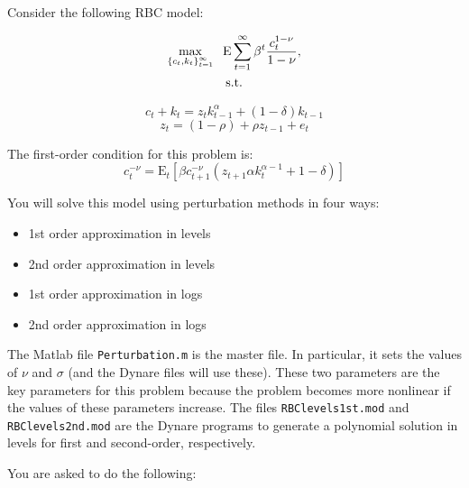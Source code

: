 \documentclass{article}
\begin{document}
\noindent Consider the following RBC model:

\begin{gather*}
\max_{\left\{ c_{t},k_{t}\right\} _{t=1}^{\infty }}\hspace{2mm}\displaystyle%
\text{E}\sum_{t=1}^{\infty }\beta ^{t}\frac{c_{t}^{1-\nu }}{1-\nu }, \\
\text{s.t.}
\end{gather*}

\begin{equation}
c_{t}+k_{t}=z_{t}k_{t-1}^{\alpha }+(1-\delta )k_{t-1}
\end{equation}%
\begin{equation}
z_{t}=(1-\rho )+\rho z_{t-1}+e_{t}
\end{equation}

\noindent The first-order condition for this problem is: 
\begin{equation}
c_{t}^{-\nu }=\text{E}_{t}\left[ \beta c_{t+1}^{-\nu }\left( z_{t+1}\alpha
k_{t}^{\alpha -1}+1-\delta \right) \right] 
\end{equation}

You will solve this model using perturbation methods in four ways:

\begin{itemize}
\item 1st order approximation in levels

\item 2nd order approximation in levels

\item 1st order approximation in logs

\item 2nd order approximation in logs
\end{itemize}

The Matlab file \texttt{Perturbation.m} is the master file. In particular,
it sets the values of $\nu $ and $\sigma $ (and the Dynare files will use
these). These two parameters are the key parameters for this problem because
the problem becomes more nonlinear if the values of these parameters
increase. The files \texttt{RBClevels1st.mod}  and \texttt{RBClevels2nd.mod}
are the Dynare programs to generate a polynomial solution in levels for
first and second-order, respectively. 

You are asked to do the following:
\end{document}
